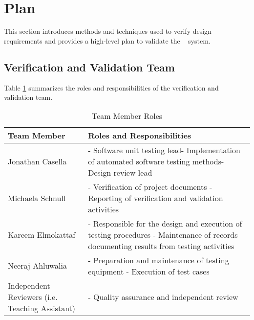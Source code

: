 \documentclass[12pt, titlepage]{article}
\begin{document}
\section{Plan} \label{Plan}


This section introduces methods and techniques used to verify design requirements and provides a high-level plan to validate the \progname~ system. 

\subsection{Verification and Validation Team}

  
\noindent Table \ref{Table:Roles} summarizes the roles and responsibilities of the verification and validation team.
  
\begin{table}[h]
\caption{Team Member Roles}
\label{Table:Roles}
\begin{tabularx}{\textwidth}{|p{5cm}|X|}
\hline{\bf Team Member} & {\bf Roles and Responsibilities} \\
\hline
Jonathan Casella & - Software unit testing lead\newline - Implementation of automated software testing methods\newline - Design review lead\\
\hline
Michaela Schnull &  - Verification of project documents \newline - Reporting of verification and validation activities\\
\hline
Kareem Elmokattaf &  - Responsible for the design and execution of testing procedures \newline - Maintenance of  records documenting results from testing activities\\
\hline
Neeraj Ahluwalia &  - Preparation and maintenance of testing equipment \newline - Execution of test cases\\
\hline
Independent Reviewers (i.e. Teaching Assistant) &  - Quality assurance and independent review\\
\hline
\end{tabularx}
\label{Table:Roles}
\end{table}
\end{document}
